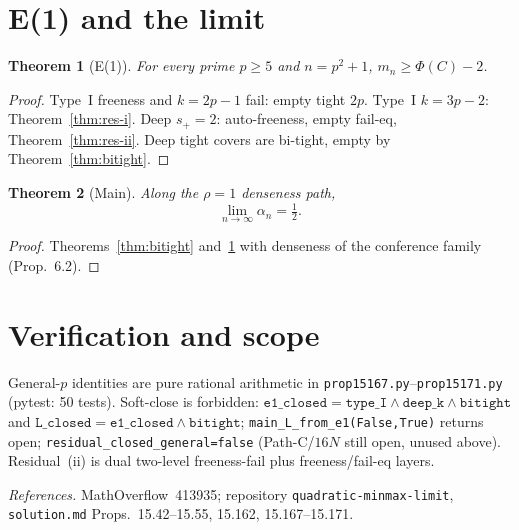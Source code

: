 \documentclass[10pt]{article}
\theoremstyle{plain}
\newtheorem{theorem}{Theorem}
\theoremstyle{remark}
\begin{document}
\section{E(1) and the limit}

\begin{theorem}[E(1)]
\label{thm:e1}
For every prime $p\ge5$ and $n=p^2+1$, $m_n\ge\Phi(C)-2$.
\end{theorem}

\begin{proof}
Type~I freeness and $k=2p-1$ fail: empty tight $2p$.
Type~I $k=3p-2$: Theorem~\ref{thm:res-i}.
Deep $s_+=2$: auto-freeness, empty fail-eq, Theorem~\ref{thm:res-ii}.
Deep tight covers are bi-tight, empty by Theorem~\ref{thm:bitight}.
\end{proof}

\begin{theorem}[Main]
\label{thm:main}
Along the $\rho=1$ denseness path,
\[
\lim_{n\to\infty}\alpha_n=\tfrac12.
\]
\end{theorem}

\begin{proof}
Theorems~\ref{thm:bitight} and~\ref{thm:e1} with denseness of the conference family
(Prop.\ 6.2).
\end{proof}

\section{Verification and scope}

General-$p$ identities are pure rational arithmetic in
\texttt{prop15167.py}--\texttt{prop15171.py} (pytest: 50 tests). Soft-close is
forbidden:
$\texttt{e1\_closed}=\texttt{type\_I}\land\texttt{deep\_k}\land\texttt{bitight}$
and $\texttt{L\_closed}=\texttt{e1\_closed}\land\texttt{bitight}$;
\texttt{main\_L\_from\_e1(False,True)} returns open;
\texttt{residual\_closed\_general=false} (Path-C/$16N$ still open, unused above).
Residual~(ii) is dual two-level freeness-fail plus freeness/fail-eq layers.

\vspace{0.25em}
\noindent\textit{References.}
MathOverflow~413935;
repository \texttt{quadratic-minmax-limit}, \texttt{solution.md}
Props.\ 15.42--15.55, 15.162, 15.167--15.171.
\end{document}

